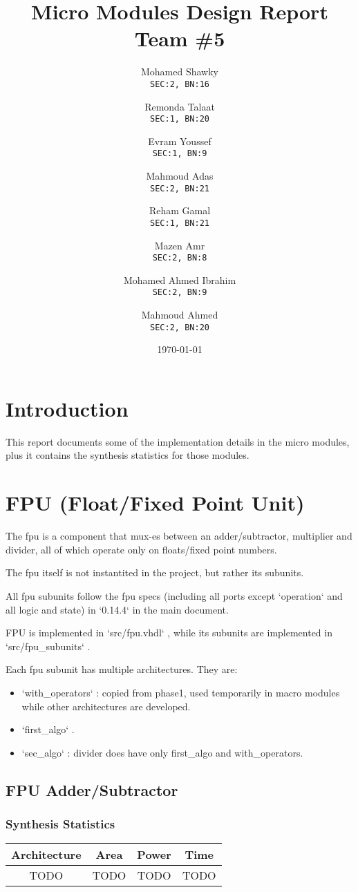 \documentclass[12pt]{report}
\title{\textbf{Micro Modules Design Report}\\Team \#5}
\author{
  Mohamed Shawky\\
  \small\texttt{SEC:2, BN:16}
  \and
  Remonda Talaat\\
  \small\texttt{SEC:1, BN:20}
  \and
  Evram Youssef\\
  \small\texttt{SEC:1, BN:9}
  \and
  Mahmoud Adas\\
  \small\texttt{SEC:2, BN:21}
  \and
  Reham Gamal\\
  \small\texttt{SEC:1, BN:21}
  \and
  Mazen Amr\\
  \small\texttt{SEC:2, BN:8}
  \and
  Mohamed Ahmed Ibrahim\\
  \small\texttt{SEC:2, BN:9}
  \and
  Mahmoud Ahmed\\
  \small\texttt{SEC:2, BN:20}
}
\date{\today}
\begin{document}
    \thispagestyle{empty}

    \maketitle
    \tableofcontents
    \clearpage


    \section{Introduction}
    This report documents some of the implementation details in the micro modules, plus it contains the synthesis statistics for those modules. 

    \section{FPU (Float/Fixed Point Unit)}
    The fpu is a component that mux-es between an adder/subtractor, multiplier and divider, all of which operate only on floats/fixed point numbers. 

    The fpu itself is not instantited in the project, but rather its subunits. 

    All fpu subunits follow the fpu specs (including all ports except `operation` and all logic and state) in `0.14.4` in the main document. 

    FPU is implemented in `src/fpu.vhdl` , while its subunits are implemented in `src/fpu\_subunits` . 

    Each fpu subunit has multiple architectures. 
    They are: 
    \begin{itemize}
      \item `with\_operators` : copied from phase1, used temporarily in macro modules while other architectures are developed. 
    \item `first\_algo` . 
    \item `sec\_algo` : divider does have only first\_algo and with\_operators. 
    \end{itemize}

    \subsection{FPU Adder/Subtractor}
    \subsubsection{Synthesis Statistics}
    \begin{tabular}{||c|c|c|c||}
      \hline
      Architecture & Area & Power & Time\\\hline\hline
      TODO & TODO & TODO & TODO\\\hline
  \end{tabular}
\end{document}

